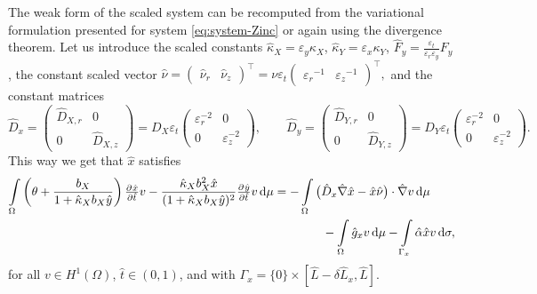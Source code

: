 \documentclass[11pt]{article}
\begin{document}
The weak form of the scaled system can be recomputed from the variational formulation presented for system \eqref{eq:system-Zinc} or again using the divergence theorem. %
Let us introduce the scaled constants 
\(\hat{\kappa}_X = \varepsilon_y \kappa_X\), \(\hat{\kappa}_Y = \varepsilon_x \kappa_Y\), \(\hat{F}_y = \frac{\varepsilon_t}{\varepsilon_r \varepsilon_y} F_y \),
the constant scaled vector 
\(
    \hat{\nu} = 
    (\begin{smallmatrix}
        \hat{\nu}_r
        &
        \hat{\nu}_z
    \end{smallmatrix})^\top
    =
    \nu \varepsilon_t
    (\begin{smallmatrix}
        {\varepsilon_r}^{-1}
        &
        {\varepsilon_z}^{-1}
    \end{smallmatrix})^\top,
\) 
and the constant matrices
\[
    \hat{D}_x = 
    \begin{pmatrix}
         \hat{D}_{X,r} & 0 
         \\
        0 &  \hat{D}_{X,z}
    \end{pmatrix}
    =
    D_X \varepsilon_t
    \begin{pmatrix}
         \varepsilon_r^{-2} & 0 
         \\
        0 &  \varepsilon_z^{-2}
    \end{pmatrix}
    ,\qquad
    \hat{D}_y = 
    \begin{pmatrix}
         \hat{D}_{Y,r} & 0 
         \\
        0 &  \hat{D}_{Y,z}
    \end{pmatrix}
    =
    D_Y \varepsilon_t
    \begin{pmatrix}
         \varepsilon_r^{-2} & 0 
         \\
        0 &  \varepsilon_z^{-2}
    \end{pmatrix}.
\]
This way we get that \( \hat{x}\) satisfies
\begin{equation}
\label{eq:non-dim-x}
\begin{aligned}
    \int\limits_\Omega
    \left( \theta + \frac{b_X}{1 + \hat{\kappa}_X b_X \hat{y}} \right)  \pd{\hat{x}}{\hat{t}} v 
    -
    \frac{\hat{\kappa}_X b_X^2 \hat{x}}{(1+\hat{\kappa}_X b_X \hat{y})^2} \pd{\hat y}{\hat t} v
    \dif\mu
    &=
    -\int\limits_\Omega 
    \big( \hat{D}_x \hat{\nabla} \hat{x} - \hat{x}\hat{\nu}\big) \cdot \hat{\nabla} v \dif\mu
    \\
    &\qquad\qquad
    -\int\limits_\Omega \hat{g}_x v \dif\mu
    -\int\limits_{\Gamma_{x}}    \hat{\alpha} \hat{x} v    \dif \sigma,
\end{aligned}
\end{equation}
for all \( v\in H^1 (\Omega)\), \(\hat{t}\in (0,1)\), and
with $\Gamma_{x} = \{0\}\times [\hat{L}-\delta \hat{L}_x,\hat{L}]$.
\end{document}
